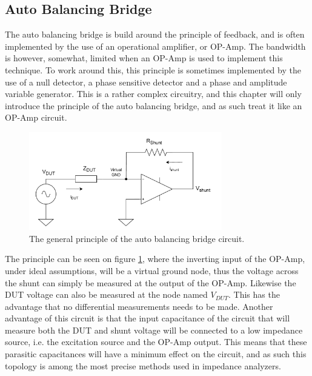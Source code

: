 \subsection{Auto Balancing Bridge} \label{ssec:AutoBalanceBridge}
The auto balancing bridge is build around the principle of feedback, and is often implemented by the use of an operational amplifier, or OP-Amp. The bandwidth is however, somewhat, limited when an OP-Amp is used to implement this technique. To work around this, this principle is sometimes implemented by the use of a null detector, a phase sensitive detector and a phase and amplitude variable generator. This is a rather complex circuitry, and this chapter will only introduce the principle of the auto balancing bridge, and as such treat it like 
an OP-Amp circuit.

\begin{figure}[H]
    \centering
    \includegraphics[width=0.75\textwidth]{Sections/4_TechnicalAnalysis/Figures_JFT/AutoBalanceBridge.pdf}
    \caption{The general principle of the auto balancing bridge circuit.}
    \label{fig_4_2_AutoBalanceBridge}
\end{figure}

The principle can be seen on figure \ref{fig_4_2_AutoBalanceBridge}, where the inverting input of the OP-Amp, under ideal assumptions, will be a virtual ground node, thus the voltage across the shunt can simply be measured at the output of the OP-Amp. Likewise the DUT voltage can also be measured at the node named $V_{DUT}$. This has the advantage that no differential measurements needs to be made. Another
advantage of this circuit is that the input capacitance of the circuit that will measure both the DUT and shunt voltage will be connected
to a low impedance source, i.e. the excitation source and the OP-Amp output. This means that these parasitic capacitances will have a minimum effect on the circuit, and as such this topology is among the most precise methods used in impedance analyzers.

